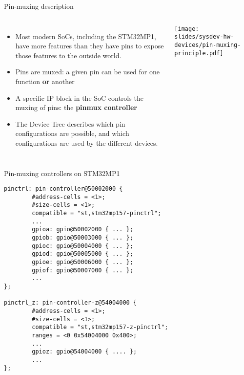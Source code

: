 \begin{frame}{Pin-muxing description}
  \begin{columns}[T]
    \begin{itemize}
    \item Most modern SoCs, including the STM32MP1, have more features
      than they have pins to expose those features to the outside world.
    \item Pins are muxed: a given pin can be used for one function
      {\bf or} another
    \item A specific IP block in the SoC controls the muxing of pins:
      the {\bf pinmux controller}
    \item The Device Tree describes which pin configurations are
      possible, and which configurations are used by the different
      devices.
    \end{itemize}
    \texttt{[image: slides/sysdev-hw-devices/pin-muxing-principle.pdf]}
  \end{columns}
\end{frame}

\begin{frame}[fragile]{Pin-muxing controllers on STM32MP1}
  \begin{block}{}
{\tiny
\begin{verbatim}
pinctrl: pin-controller@50002000 {
        #address-cells = <1>;
        #size-cells = <1>;
        compatible = "st,stm32mp157-pinctrl";
        ...
        gpioa: gpio@50002000 { ... };
        gpiob: gpio@50003000 { ... };
        gpioc: gpio@50004000 { ... };
        gpiod: gpio@50005000 { ... };
        gpioe: gpio@50006000 { ... };
        gpiof: gpio@50007000 { ... };
        ...
};

pinctrl_z: pin-controller-z@54004000 {
        #address-cells = <1>;
        #size-cells = <1>;
        compatible = "st,stm32mp157-z-pinctrl";
        ranges = <0 0x54004000 0x400>;
        ...
        gpioz: gpio@54004000 { .... };
        ...
};
\end{verbatim}
}
  \end{block}
\end{frame}

